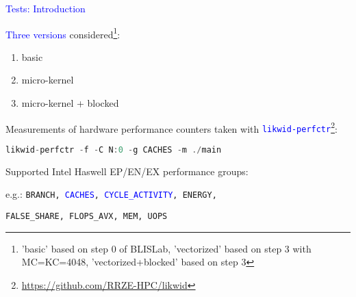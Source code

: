 \documentclass[11pt]{beamer}
\begin{document}
\begin{frame}[fragile]{\textcolor{blue}{Tests: Introduction}}

\textcolor{blue}{Three versions} considered\footnote{'basic' based on step 0 of BLISLab, 'vectorized' based on step 3 with MC=KC=4048, 'vectorized+blocked' based on step 3}:
\begin{enumerate}
\item basic
\item micro-kernel
\item micro-kernel + blocked
\end{enumerate}

\vspace{0.5cm}

Measurements of hardware performance counters taken with \textcolor{blue}{\texttt{likwid-perfctr}}\footnote{
\url{https://github.com/RRZE-HPC/likwid}
}:


\begin{footnotesize}
\begin{lstlisting}[language=C++]
	likwid-perfctr -f -C N:0 -g CACHES -m ./main
\end{lstlisting}
\end{footnotesize}

Supported Intel Haswell EP/EN/EX performance groups: 

\qquad e.g.: \texttt{BRANCH, \textcolor{blue}{CACHES}, \textcolor{blue}{CYCLE\_ACTIVITY}, ENERGY,} 

\qquad\qquad\texttt{FALSE\_SHARE, FLOPS\_AVX, MEM, UOPS }

\end{frame}
\end{document}
